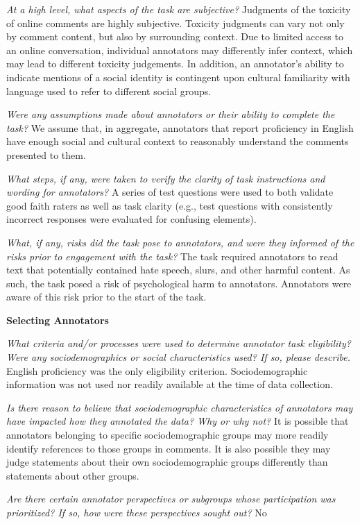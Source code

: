 \textit{At a high level, what aspects of the task are subjective?}
Judgments of the toxicity of online comments are highly subjective. Toxicity judgments can vary not only by comment content, but also by surrounding context. Due to limited access to an online conversation, individual annotators may differently infer context, which may lead to different toxicity judgements. In addition, an annotator’s ability to indicate mentions of a social identity is contingent upon cultural familiarity with language used to refer to different social groups.

\textit{Were any assumptions made about annotators or their ability to complete the task?}
We assume that, in aggregate, annotators that report proficiency in English have enough social and cultural context to reasonably understand the comments presented to them.

\textit{What steps, if any, were taken to verify the clarity of task instructions and wording for annotators?}
A series of test questions were used to both validate good faith raters as well as task clarity (e.g., test questions with consistently incorrect responses were evaluated for confusing elements).

\textit{What, if any, risks did the task pose to annotators, and were they informed of the risks prior to engagement with the task?}
The task required annotators to read text that potentially contained hate speech, slurs, and other harmful content. As such, the task posed a risk of psychological harm to annotators. Annotators were aware of this risk prior to the start of the task.

\textbf{Selecting Annotators}

\textit{What criteria and/or processes were used to determine annotator task eligibility? Were any sociodemographics or social characteristics used? If so, please describe.}
English proficiency was the only eligibility criterion.
Sociodemographic information was not used nor readily available at the time of data collection.

\textit{Is there reason to believe that sociodemographic characteristics of annotators may have impacted how they annotated the data? Why or why not?}
It is possible that annotators belonging to specific sociodemographic groups may more readily identify references to those groups in comments. It is also possible they may judge statements about their own sociodemographic groups differently than statements about other groups.

\textit{Are there certain annotator perspectives or subgroups whose participation was prioritized? If so, how were these perspectives sought out?}
No

